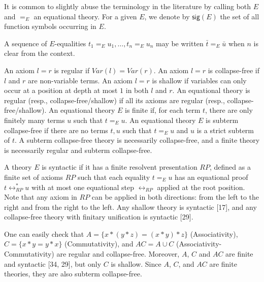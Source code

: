 \documentclass[10pt,a4paper]{amsart}
\begin{document}
 
 
It is common to slightly abuse the terminology in the literature by calling both $E$ and $=_{E}$ an equational theory. For a given $E$, we denote by $\mathsf{sig}(E)$ the set of all function symbols occurring in $E$.\par
 
 
 
A sequence of $E$-equalities $t_{1}=_{E}u_{1},\dots,t_{n}=_{E}u_{n}$ may be written $\bar{t}=_{E}\bar{u}$ when $n$ is clear from the context.\par
 
 
 
An axiom $l=r$ is regular if $\mathit{Var}(l)=\mathit{Var}(r)$. An axiom $l=r$ is collapse-free if $l$ and $r$ are non-variable terms. An axiom $l=r$ is shallow if variables can only occur at a position at depth at most $1$ in both $l$ and $r$. An equational theory is regular (resp., collapse-free/shallow) if all its axioms are regular (resp., collapse-free/shallow). An equational theory $E$ is finite if, for each term $t$, there are only finitely many terms $u$ such that $t=_{E}u$. An equational theory $E$ is subterm collapse-free if there are no terms $t,u$ such that $t=_{E}u$ and $u$ is a strict subterm of $t$. A subterm collapse-free theory is necessarily collapse-free, and a finite theory is necessarily regular and subterm collapse-free.\par
 
 
 
A theory $E$ is syntactic if it has a finite resolvent presentation $RP$, defined as a finite set of axioms $RP$ such that each equality $t=_{E}u$ has an equational proof $t\leftrightarrow_{RP}^{*}u$ with at most one equational step $\leftrightarrow_{RP}$ applied at the root position. Note that any axiom in $RP$ can be applied in both directions: from the left to the right and from the right to the left. Any shallow theory is syntactic [17], and any collapse-free theory with finitary unification is syntactic [29].\par
 
 
 
One can easily check that $A=\{x*(y*z)=(x*y)*z\}$ (Associativity), $C=\{x*y=y*x\}$ (Commutativity), and $AC=A\cup C$ (Associativity-Commutativity) are regular and collapse-free. Moreover, $A$, $C$ and $AC$ are finite and syntactic [34, 29], but only $C$ is shallow. Since $A$, $C$, and $AC$ are finite theories, they are also subterm collapse-free.\par
 
\end{document}

